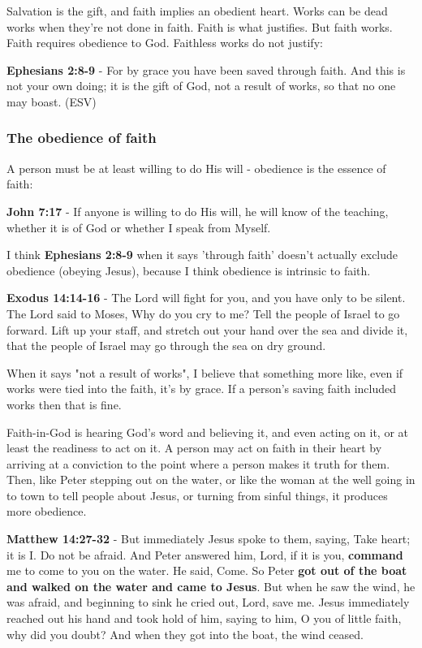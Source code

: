 \documentclass[11pt]{article}
\begin{document}
Salvation is the gift, and faith implies an obedient heart. Works can be dead works when they're not done in faith. Faith is what justifies. But faith works. Faith requires obedience to God. Faithless works do not justify:

\textbf{Ephesians 2:8-9} - For by grace you have been saved through faith. And this is not your own doing; it is the gift of God, not a result of works, so that no one may boast. (ESV)

\subsubsection{The obedience of faith}
\label{sec:orgfdf6766}

A person must be at least willing to do His will - obedience is the essence of faith:

\textbf{John 7:17} - If anyone is willing to do His will, he will know of the teaching, whether it is of God or whether I speak from Myself.

I think \textbf{Ephesians 2:8-9} when it says 'through faith' doesn't actually exclude obedience (obeying Jesus), because I think obedience is intrinsic to faith.

\textbf{Exodus 14:14-16} - The Lord will fight for you, and you have only to be silent.  The Lord said to Moses, Why do you cry to me? Tell the people of Israel to go forward.  Lift up your staff, and stretch out your hand over the sea and divide it, that the people of Israel may go through the sea on dry ground.

When it says "not a result of works", I believe that something more like, even if works were tied into the faith, it's by grace. If a person's saving faith included works then that is fine.

Faith-in-God is hearing God's word and believing it, and even acting on it, or at least the readiness to act on it.
A person may act on faith in their heart by arriving at a conviction to the point where a person makes it truth for them.
Then, like Peter stepping out on the water, or like the woman at the well going in to town to tell people about Jesus, or turning from sinful things, it produces more obedience.

\textbf{Matthew 14:27-32} - But immediately Jesus spoke to them, saying, Take heart; it is I. Do not be afraid. And Peter answered him, Lord, if it is you, \textbf{command} me to come to you on the water. He said, Come. So Peter \textbf{got out of the boat and walked on the water and came to Jesus}. But when he saw the wind, he was afraid, and beginning to sink he cried out, Lord, save me. Jesus immediately reached out his hand and took hold of him, saying to him, O you of little faith, why did you doubt? And when they got into the boat, the wind ceased.
\end{document}
